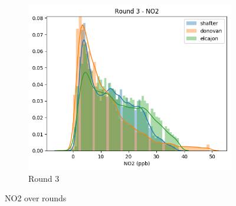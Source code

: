 \documentclass[journal abbreviation, manuscript]{copernicus}
\begin{document}
\begin{figure}[H]
\begin{subfigure}{0.32\textwidth}
\includegraphics[width=\textwidth]{results/distributions/round3_no2.png}
\caption{Round 3}
\end{subfigure}
\caption{NO2 over rounds}
\label{fig:no2-rounds}
\end{figure}
\end{document}
